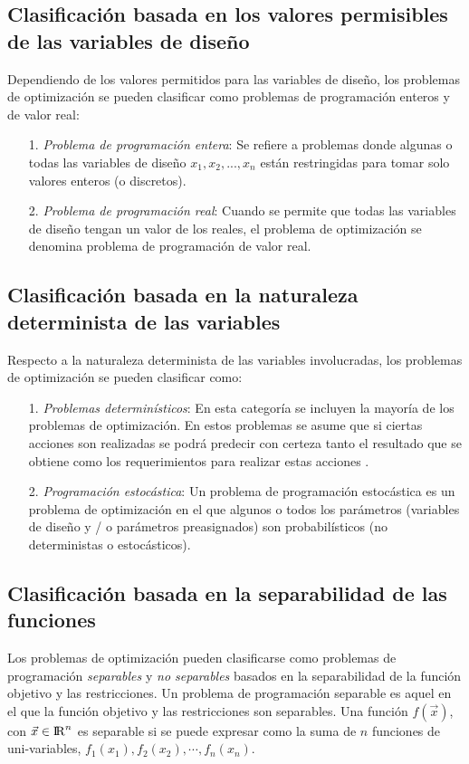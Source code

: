 \subsection{Clasificación basada en los valores permisibles de las variables de diseño}
Dependiendo de los valores permitidos para las variables de diseño, los problemas de optimización se pueden clasificar como problemas de programación enteros y de valor real:
\begin{itemize}
\item[1.] \textit{Problema de programación entera}: Se refiere a problemas donde algunas o todas las variables de diseño $x_1, x_2, ..., x_n$ están restringidas para tomar solo valores enteros (o discretos).
\item[2.] \textit{Problema de programación real}: Cuando se permite que todas las variables de diseño tengan un valor de los reales, el problema de optimización se denomina problema de programación de valor real.

\end{itemize}
\subsection{Clasificación basada en la naturaleza determinista de las variables}
Respecto a la naturaleza determinista de las variables involucradas, los problemas de optimización se pueden clasificar como:
\begin{itemize}
\item [1.]\textit{Problemas determinísticos}: En esta categoría se incluyen la mayoría de los problemas de optimización. En estos problemas se asume que si ciertas acciones son realizadas se podrá predecir con certeza tanto el resultado que se obtiene como los requerimientos para realizar estas acciones \cite{dantzig_linear_2016}.
\item[2.] \textit{Programación estocástica}:
Un problema de programación estocástica es un problema de optimización en el que algunos o todos los parámetros (variables de diseño y / o parámetros preasignados) son probabilísticos (no deterministas o estocásticos).

\end{itemize}
 
\subsection{Clasificación basada en la separabilidad de las funciones} 
Los problemas de optimización pueden clasificarse como problemas de programación \textit{separables} y\textit{ no separables} basados en la separabilidad de la función objetivo y las restricciones. Un problema de programación separable es aquel en el que la función objetivo y las restricciones son separables. Una función $f(\vec{x})$, con $\vec{x} \in {\rm I\!R}^{n}$ es separable si se puede expresar como la suma de $n$ funciones de uni-variables, $ f_1(x_1), f_2 (x_2), \cdots, f_n (x_n)$.

